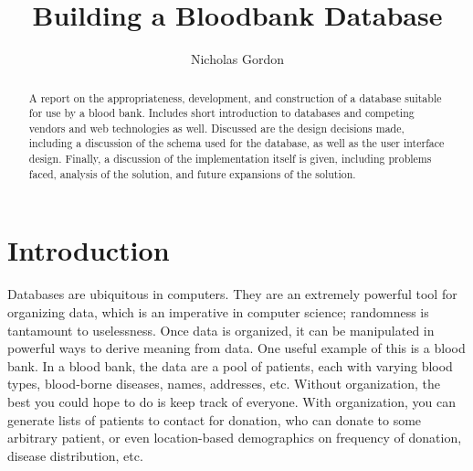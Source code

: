 \documentclass[runningheads,a4paper]{llncs}
\begin{document}


\title{Building a Bloodbank Database}

\author{Nicholas Gordon}

%
\iffalse
\author{Firstname Lastname\inst{1} \and Firstname Lastname\inst{2} }

\institute{
Insitute 1\\
\email{...}\and
Insitute 2\\
\email{...}
}
\fi
			
\maketitle

\begin{abstract}
  A report on the appropriateness, development, and construction of a
  database suitable for use by a blood bank. Includes short
  introduction to databases and competing vendors and web technologies
  as well. Discussed are the design decisions made, including a
  discussion of the schema used for the database, as well as the user
  interface design. Finally, a discussion of the implementation itself
  is given, including problems faced, analysis of the solution, and
  future expansions of the solution.
\end{abstract}


\section{Introduction}\label{sec:intro}
Databases are ubiquitous in computers. They are an extremely powerful
tool for organizing data, which is an imperative in computer science;
randomness is tantamount to uselessness. Once data is organized, it
can be manipulated in powerful ways to derive meaning from data. One
useful example of this is a blood bank. In a blood bank, the data are
a pool of patients, each with varying blood types, blood-borne
diseases, names, addresses, etc. Without organization, the best you
could hope to do is keep track of everyone. With organization, you can
generate lists of patients to contact for donation, who can donate to
some arbitrary patient, or even location-based demographics on
frequency of donation, disease distribution, etc.
\end{document}
